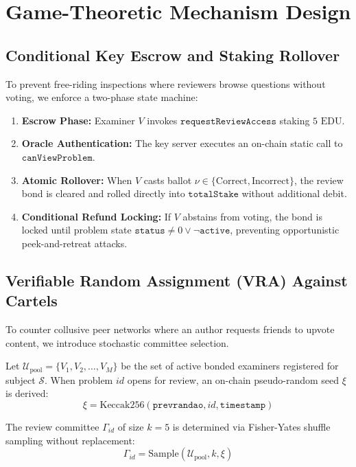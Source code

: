 \documentclass[conference,10pt]{IEEEtran}
\begin{document}
\section{Game-Theoretic Mechanism Design}

\subsection{Conditional Key Escrow and Staking Rollover}
To prevent free-riding inspections where reviewers browse questions without voting, we enforce a two-phase state machine:
\begin{enumerate}
    \item \textbf{Escrow Phase:} Examiner $V$ invokes $\mathtt{requestReviewAccess}$ staking $5\text{ EDU}$.
    \item \textbf{Oracle Authentication:} The key server executes an on-chain static call to $\mathtt{canViewProblem}$.
    \item \textbf{Atomic Rollover:} When $V$ casts ballot $\nu \in \{\text{Correct}, \text{Incorrect}\}$, the review bond is cleared and rolled directly into $\mathtt{totalStake}$ without additional debit.
    \item \textbf{Conditional Refund Locking:} If $V$ abstains from voting, the bond is locked until problem state $\mathtt{status} \neq 0 \lor \neg\mathtt{active}$, preventing opportunistic peek-and-retreat attacks.
\end{enumerate}

\subsection{Verifiable Random Assignment (VRA) Against Cartels}
To counter collusive peer networks where an author requests friends to upvote content, we introduce stochastic committee selection.

Let $\mathcal{U}_{\text{pool}} = \{V_1, V_2, \dots, V_M\}$ be the set of active bonded examiners registered for subject $\mathcal{S}$. When problem $id$ opens for review, an on-chain pseudo-random seed $\xi$ is derived:
\begin{equation}
    \xi = \text{Keccak256}(\mathtt{prevrandao}, id, \mathtt{timestamp})
\end{equation}

The review committee $\Gamma_{id}$ of size $k = 5$ is determined via Fisher-Yates shuffle sampling without replacement:
\begin{equation}
    \Gamma_{id} = \text{Sample}(\mathcal{U}_{\text{pool}}, k, \xi)
\end{equation}
\end{document}
